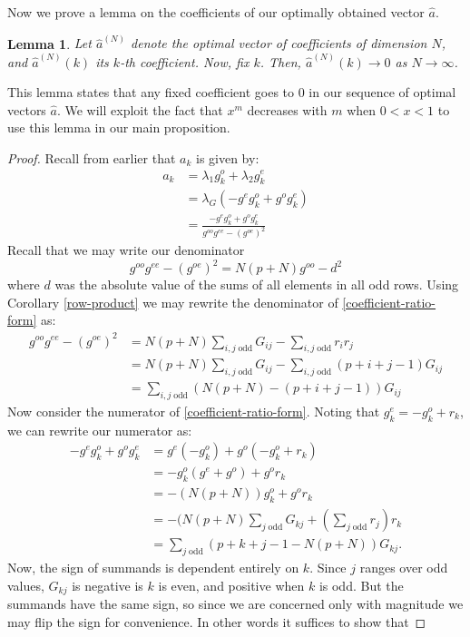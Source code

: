 \documentclass{article}
\newtheorem{lem}[thm]{Lemma}
\theoremstyle{definition}
\theoremstyle{remark}
\numberwithin{equation}{section}
\begin{document}
Now we prove a lemma on the coefficients of our optimally obtained vector $\hat{a}$.
\begin{lem}\label{coefficients-vanish}
Let $\hat{a}^{(N)}$ denote the optimal vector of coefficients of dimension $N$, and $\hat{a}^{(N)}(k)$ its $k$-th coefficient. Now, fix $k$. Then, $\hat{a}^{(N)}(k) \to 0$ as $N\to \infty$.
\end{lem}
This lemma states that any fixed coefficient goes to 0 in our sequence of optimal vectors $\hat{a}$. We will exploit the fact that $x^m$ decreases with $m$ when $0<x<1$ to use this lemma in our main proposition. 
\begin{proof}
Recall from earlier that $a_k$ is given by:
\begin{align}
a_{k} &= \lambda_1 g_k^o + \lambda_2g^e_k \\
&= \lambda_G(-g^eg_k^o + g^og_k^e) \\
&= \frac{-g^eg_k^o + g^og_k^e}{g^{oo} g^{ee}-(g^{oe})^2}\label{coefficient-ratio-form}
\end{align}
Recall that we may write our denominator
\[g^{oo} g^{ee}-(g^{oe})^2 = N(p+N)g^{oo} - d^2 \]
where $d$ was the absolute value of the sums of all elements in all odd rows. Using Corollary \ref{row-product} we may rewrite the denominator of \ref{coefficient-ratio-form} as:
\begin{align*}
g^{oo} g^{ee}-(g^{oe})^2 &= N(p+N) \sum_{i,j \; \text{odd}} G_{ij} - \sum_{i,j \; \text{odd}} r_ir_j \\
&= N(p+N) \sum_{i,j \; \text{odd}} G_{ij} - \sum_{i,j \; \text{odd}} (p+i+j-1) G_{ij}\\
&= \sum_{i,j \; \text{odd}}  (N(p+N) -(p+i+j-1))G_{ij}
\end{align*}
Now consider the numerator of  \ref{coefficient-ratio-form}. Noting that $g_k^e = -g_k^o + r_k$, we can rewrite our numerator as: 
\begin{align*}
-g^eg_k^o + g^og_k^e &= g^e(-g^o_k) + g^o(-g^o_k + r_k)\\
&= -g^o_k(g^e+g^o) + g^o r_k\\
&= -(N(p+N))g_k^o + g^or_k\\
&= -(N(p+N)\sum_{j \; \text{odd}} G_{kj} + \left(\sum_{j \; \text{odd}}r_j \right)r_k \\
&= \sum_{j\; \text{odd}} (p+k+j-1 - N(p+N))G_{kj}.
\end{align*}
Now, the sign of summands is dependent entirely on $k$. Since $j$ ranges over odd values, $G_{kj}$ is negative is $k$ is even, and positive when $k$ is odd. But the summands have the same sign, so since we are concerned only with magnitude we may flip the sign for convenience. In other words it suffices to show that

\end{proof}
\end{document}
